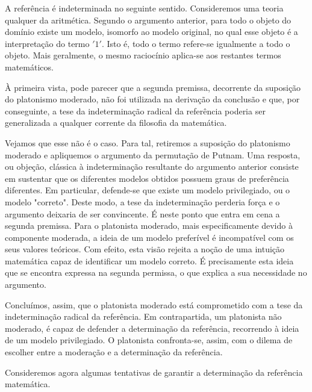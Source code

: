 \documentclass{article}
\begin{document}
\vspace{0.5cm}

A referência é indeterminada no seguinte sentido. Consideremos uma teoria qualquer da aritmética. Segundo o argumento anterior, para todo o objeto do domínio existe um modelo, isomorfo ao modelo original, no qual esse objeto é a interpretação do termo $'1'$. Isto é, todo o termo refere-se igualmente a todo o objeto. Mais geralmente, o mesmo raciocínio aplica-se aos restantes termos matemáticos.

\vspace{0.5cm}

À primeira vista, pode parecer que a segunda premissa, decorrente da suposição do platonismo moderado, não foi utilizada na derivação da conclusão e que, por conseguinte, a tese da indeterminação radical da referência poderia ser generalizada a qualquer corrente da filosofia da matemática. 

Vejamos que esse não é o caso. Para tal, retiremos a suposição do platonismo moderado e apliquemos o argumento da permutação de Putnam. Uma resposta, ou objeção, clássica à indeterminação resultante do argumento anterior consiste em sustentar que os diferentes modelos obtidos possuem graus de preferência diferentes. Em particular, defende-se que existe um modelo privilegiado, ou o modelo "correto". Deste modo, a tese da indeterminação perderia força e o argumento deixaria de ser convincente. É neste ponto que entra em cena a segunda premissa. Para o platonista moderado, mais especificamente devido à componente moderada, a ideia de um modelo preferível é incompatível com os seus valores teóricos. Com efeito, esta visão rejeita a noção de uma intuição matemática capaz de identificar um modelo correto. É precisamente esta ideia que se encontra expressa na segunda permissa, o que explica a sua necessidade no argumento. 

Concluímos, assim, que o platonista moderado está comprometido com a tese da indeterminação radical da referência. Em contrapartida, um platonista não moderado, é capaz de defender a determinação da referência, recorrendo à ideia de um modelo privilegiado. O platonista confronta-se, assim, com o dilema de escolher entre a moderação e a determinação da referência.

\vspace{0.5cm}

Consideremos agora algumas tentativas de garantir a determinação da referência matemática.\\
\end{document}
